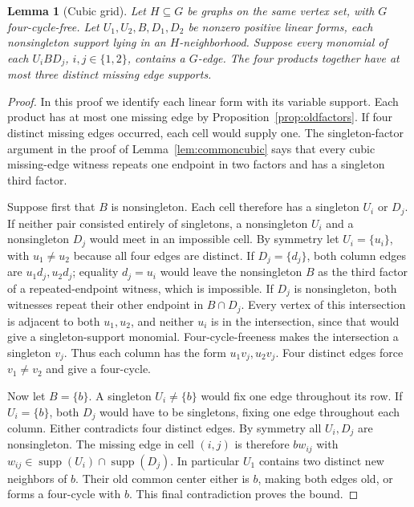 \documentclass[11pt]{article}
\newcommand{\supp}{\operatorname{supp}}
\newtheorem{lemma}[theorem]{Lemma}
\theoremstyle{definition}
\theoremstyle{remark}
\begin{document}
\begin{lemma}[Cubic grid]\label{lem:cubicgrid}
Let $H\subseteq G$ be graphs on the same vertex set, with $G$ four-cycle-free. Let $U_1,U_2,B,D_1,D_2$ be nonzero positive linear forms, each nonsingleton support lying in an $H$-neighborhood. Suppose every monomial of each $U_iBD_j$, $i,j\in\{1,2\}$, contains a $G$-edge. The four products together have at most three distinct missing edge supports.
\end{lemma}
\begin{proof}
In this proof we identify each linear form with its variable support. Each product has at most one missing edge by Proposition~\ref{prop:oldfactors}. If four distinct missing edges occurred, each cell would supply one. The singleton-factor argument in the proof of Lemma~\ref{lem:commoncubic} says that every cubic missing-edge witness repeats one endpoint in two factors and has a singleton third factor.

Suppose first that $B$ is nonsingleton. Each cell therefore has a singleton $U_i$ or $D_j$. If neither pair consisted entirely of singletons, a nonsingleton $U_i$ and a nonsingleton $D_j$ would meet in an impossible cell. By symmetry let $U_i=\{u_i\}$, with $u_1\ne u_2$ because all four edges are distinct. If $D_j=\{d_j\}$, both column edges are $u_1d_j,u_2d_j$; equality $d_j=u_i$ would leave the nonsingleton $B$ as the third factor of a repeated-endpoint witness, which is impossible. If $D_j$ is nonsingleton, both witnesses repeat their other endpoint in $B\cap D_j$. Every vertex of this intersection is adjacent to both $u_1,u_2$, and neither $u_i$ is in the intersection, since that would give a singleton-support monomial. Four-cycle-freeness makes the intersection a singleton $v_j$. Thus each column has the form $u_1v_j,u_2v_j$. Four distinct edges force $v_1\ne v_2$ and give a four-cycle.

Now let $B=\{b\}$. A singleton $U_i\ne\{b\}$ would fix one edge throughout its row. If $U_i=\{b\}$, both $D_j$ would have to be singletons, fixing one edge throughout each column. Either contradicts four distinct edges. By symmetry all $U_i,D_j$ are nonsingleton. The missing edge in cell $(i,j)$ is therefore $bw_{ij}$ with $w_{ij}\in\supp(U_i)\cap\supp(D_j)$. In particular $U_1$ contains two distinct new neighbors of $b$. Their old common center either is $b$, making both edges old, or forms a four-cycle with $b$. This final contradiction proves the bound.
\end{proof}
\end{document}
